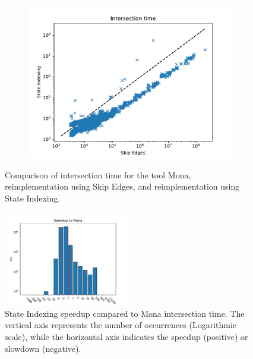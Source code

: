 \documentclass[pdflatex,sn-mathphys-num]{sn-jnl}%
\theoremstyle{thmstyleone}%
\theoremstyle{thmstyletwo}%
\theoremstyle{thmstylethree}%
\begin{document}
\begin{figure}[h!]
\begin{subfigure}{0.49\textwidth}
                    \includegraphics[width=\textwidth]{Figures/intersection-mata.pdf}
                \end{subfigure}
                \caption{Comparison of intersection time for the tool Mona, reimplementation using Skip Edges, and reimplementation using State Indexing.}
                \label{fig:intersection_log}
            \end{figure}
            \vspace*{-3em}
            \begin{figure}[h!]
                \centering
                \includegraphics[width=0.49\textwidth]{Figures/intersection-speedup.pdf}
                \caption{State Indexing speedup compared to Mona intersection time. The vertical axis represents the number of occurrences (Logarithmic scale), while the horizontal axis indicates the speedup (positive) or slowdown (negative).}
                \label{fig:intersection_speedup}
            \end{figure}
\end{document}
